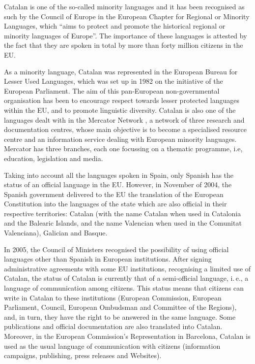 \begin{multicols}{2}
Catalan is one of the so-called minority languages and it has been recognised as such by the Council of Europe in the European Chapter for Regional or Minority Languages, which “aims to protect and promote the historical regional or minority languages of Europe”. The importance of these languages is attested by the fact that they are spoken in total by more than forty million citizens in the EU.

As a minority language, Catalan was represented in the European Bureau for Lesser Used Languages, which was set up in 1982 on the initiative of the European Parliament. The aim of this pan-European non-governmental organisation has been to encourage respect towards lesser protected languages within the EU, and to promote linguistic diversity. Catalan is also one of the languages dealt with in the Mercator Network \cite{CAT-Nota8}, a network of three research and documentation centres, whose main objective is to become a specialised resource centre and an information service dealing with European minority languages. Mercator has three branches, each one focus\-sing on a thematic programme, i.e, education, legislation and media.


Taking into account all the languages spoken in Spain, only Spanish has the status of an official language in the EU.  However, in November of 2004, the Spanish government delivered to the EU the translation of the European Constitution into the languages of the state which are also official in their respective territories: Catalan (with the name Catalan when used in Catalonia and the Balearic Islands, and the name Valencian when used in the Comunitat Valenciana), Galician and Basque. 

In 2005, the Council of Ministers recognised the possibility of using official languages other than Spanish in European institutions. After signing administrative agreements with some EU institutions, recognising a limited use of Catalan, the status of Catalan is currently that of a semi-official language, i.\,e., a language of communication among citizens. This status means that citizens can write in Catalan to these institutions (European Commission, European Parliament, Council, European Ombudsman and Committee of the Regions), and, in turn, they have the right to be answered in the same language. Some publications and official documentation are also translated into Catalan. Moreover, in the European Commission’s Representation in Barcelona, Catalan is used as the usual language of communication with citizens (information campaigns, publishing, press releases and Websites).


\end{multicols}
